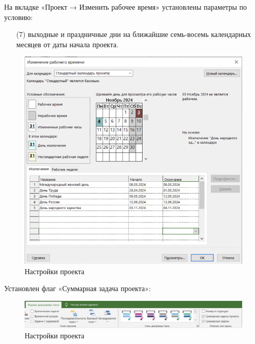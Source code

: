 На вкладке «Проект → Изменить рабочее время» установлены параметры по
условию:

\begin{itemize}
\item[(7)] выходные и праздничные дни на ближайшие семь-восемь
календарных месяцев от даты начала проекта.
\end{itemize}

\begin{figure}[h!]
	\begin{center}
		\includegraphics[scale=0.55]{inc/img/p_7.png}
	\end{center}
	\captionsetup{justification=centering}
	\caption{Настройки проекта}
	\label{fig:u3}
\end{figure}

Установлен флаг «Суммарная задача проекта»:

\begin{figure}[h!]
	\begin{center}
		\includegraphics[scale=0.4]{inc/img/p_8.png}
	\end{center}
	\captionsetup{justification=centering}
	\caption{Настройки проекта}
	\label{fig:u3}
\end{figure}

